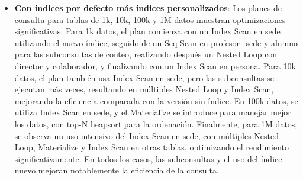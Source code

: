 \begin{itemize}
\begin{itemize}
            \item {\textbf{Con índices por defecto más índices personalizados}: Los planes de consulta para tablas de 1k, 10k, 100k y 1M datos muestran optimizaciones significativas. Para 1k datos, el plan comienza con un Index Scan en sede utilizando el nuevo índice, seguido de un Seq Scan en profesor\_sede y alumno para las subconsultas de conteo, realizando después un Nested Loop con director y colaborador, y finalizando con un Index Scan en persona. Para 10k datos, el plan también usa Index Scan en sede, pero las subconsultas se ejecutan más veces, resultando en múltiples Nested Loop y Index Scan, mejorando la eficiencia comparada con la versión sin índice. En 100k datos, se utiliza Index Scan en sede, y el Materialize se introduce para manejar mejor los datos, con top-N heapsort para la ordenación. Finalmente, para 1M datos, se observa un uso intensivo del Index Scan en sede, con múltiples Nested Loop, Materialize y Index Scan en otras tablas, optimizando el rendimiento significativamente. En todos los casos, las subconsultas y el uso del índice nuevo mejoran notablemente la eficiencia de la consulta.}
      \end{itemize}
\end{itemize}
